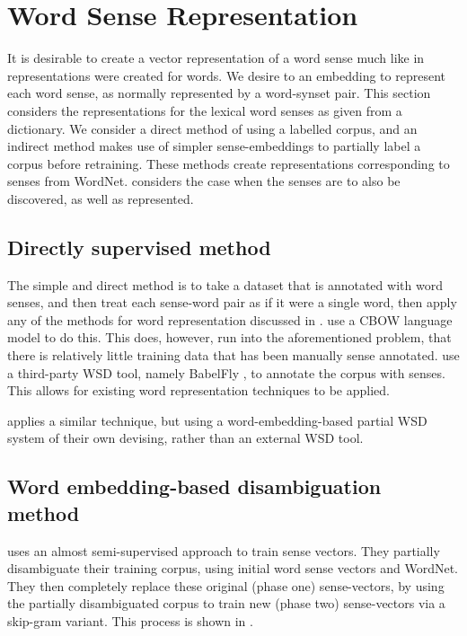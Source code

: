 {\section{Word Sense Representation}
It is desirable to create a vector representation of a word sense much like in  representations were created for words.
We desire to an embedding to represent each word sense, as normally represented by a word-synset pair.
This section considers the representations for the lexical word senses as given from a dictionary.
We consider a direct method of using a labelled corpus, and an indirect method makes use of simpler sense-embeddings to partially label a corpus before retraining.
These methods create representations corresponding to senses from WordNet.
 considers the case when the senses are to also be discovered, as well as represented.




\subsection{Directly supervised method}
The simple and direct method is to take a dataset that is annotated with word senses,
and then treat each sense-word pair as if it were a single word, then apply any of the methods for word representation discussed in .
 use a CBOW language model \parencite{mikolov2013efficient} to do this.
This does, however, run into the aforementioned problem, that there is relatively little training data that has been manually sense annotated.
\textcite{iacobacci2015sensembed} use a third-party WSD tool, namely BabelFly \parencite{Moro2014}, to annotate the corpus with senses.
This allows for existing word representation techniques to be applied.


 applies a similar technique, but using a word-embedding-based partial WSD system of their own devising, rather than an external WSD tool.


\subsection{Word embedding-based disambiguation method}\label{sec:pseudo-semi-supervised-method}



\textcite{Chen2014} uses an almost semi-supervised approach to train sense vectors.
They partially disambiguate their training corpus, using initial word sense vectors and WordNet.
They then completely replace these original (phase one) sense-vectors, by using the partially disambiguated corpus to train new (phase two) sense-vectors via a skip-gram variant.
This process is shown in .


}
